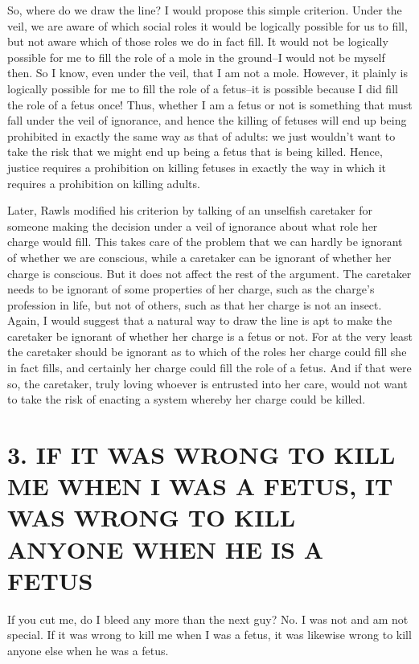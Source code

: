So,  where  do  we  draw  the  line?    I  would  propose  this  simple 
criterion.  Under the veil, we are aware of which social roles it would be 
logically possible for us to fill, but not aware which of those roles we do 
in fact fill.  It would not be logically possible for me to fill the role of a 
mole in the ground–I would not be myself then.  So I know, even under 
the veil, that I am not a mole.  However, it plainly is logically possible for 
me to fill the role of a fetus–it is possible because I did fill the role of a 
fetus once!   Thus, whether I am a fetus or not is something that must fall 
under the veil of ignorance, and hence the killing of fetuses will end up 
being  prohibited  in  exactly  the  same  way  as  that  of  adults:  we  just 
wouldn’t want to take the risk that we might end up being a fetus that is 
being killed.  Hence, justice requires a prohibition on killing fetuses in 
exactly the way in which it requires a prohibition on killing adults. 

Later,  Rawls  modified  his  criterion  by  talking  of  an  unselfish 
caretaker  for  someone  making  the  decision  under  a  veil  of  ignorance 
about what role her charge would fill.  This takes care of the problem that 
we can hardly be ignorant of whether we are conscious, while a caretaker 
can be ignorant of whether her charge is conscious.  But it does not affect 
the  rest  of  the  argument.    The  caretaker  needs  to be ignorant of some 
properties of her charge, such as the charge’s profession in life, but not of 
others, such as that her charge is not an insect.  Again, I would suggest 
that  a  natural  way  to  draw  the  line  is  apt  to  make  the  caretaker  be 
ignorant of whether her charge is a fetus or not.  For at the very least the 
caretaker should be ignorant as to which of the roles her charge could fill 
she  in  fact  fills,  and  certainly  her  charge  could  fill the role of a fetus.  
And if that were so, the caretaker, truly loving whoever is entrusted into 
her care, would not want to take the risk of enacting a system whereby 
her charge could be killed. 

\section{3. IF IT WAS WRONG TO KILL ME WHEN I WAS A FETUS, IT WAS WRONG TO KILL ANYONE WHEN HE IS A FETUS} 
If you cut me, do I bleed any more than the next guy?  No.  I was not and 
am  not  special.    If  it  was  wrong  to  kill  me  when  I was a fetus, it was 
likewise wrong to kill anyone else when he was a fetus.  

